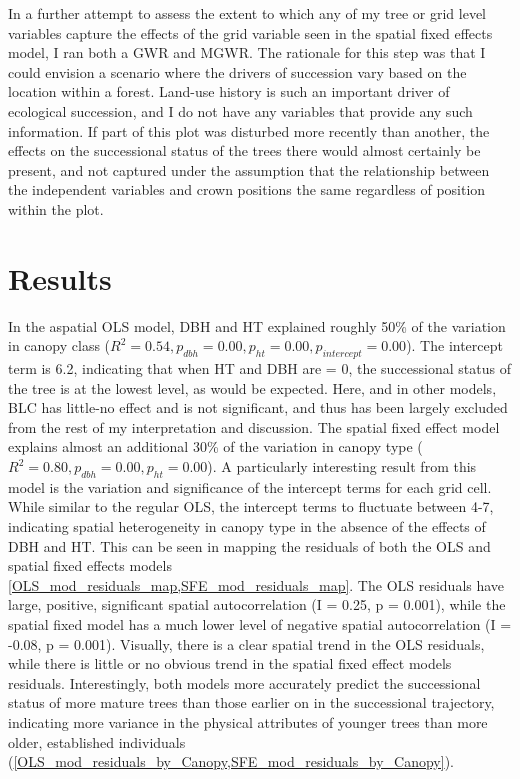 \documentclass[12pt,a4paper]{article}
\begin{document}
In a further attempt to assess the extent to which any of my tree or grid level variables capture the effects of the grid variable seen in the spatial fixed effects model, I ran both a GWR and MGWR.  The rationale for this step was that I could envision a scenario where the drivers of succession vary based on the location within a forest.  Land-use history is such an important driver of ecological succession, and I do not have any variables that provide any such information.  If part of this plot was disturbed more recently than another, the effects on the successional status of the trees there would almost certainly be present, and not captured under the assumption that the relationship between the independent variables and crown positions the same regardless of position within the plot.  

\section{Results}

In the aspatial OLS model, DBH and HT explained roughly 50\% of the variation in canopy class ($R^{2} = 0.54, p_{dbh} = 0.00, p_{ht} = 0.00, p_{intercept} = 0.00$).  The intercept term is 6.2, indicating that when HT and DBH are = 0, the successional status of the tree is at the lowest level, as would be expected.  Here, and in other models, BLC has little-no effect and is not significant, and thus has been largely excluded from the rest of my interpretation and discussion.  The spatial fixed effect model explains almost an additional 30\% of the variation in canopy type ($R^{2} = 0.80, p_{dbh} = 0.00, p_{ht} = 0.00$).  A particularly interesting result from this model is the variation and significance of the intercept terms for each grid cell.  While similar to the regular OLS, the intercept terms to fluctuate between 4-7, indicating spatial heterogeneity in canopy type in the absence of the effects of DBH and HT.  This can be seen in mapping the residuals of both the OLS and spatial fixed effects models \cref{OLS_mod_residuals_map,SFE_mod_residuals_map}.  The OLS residuals have large, positive, significant spatial autocorrelation (I = 0.25, p = 0.001), while the spatial fixed model has a much lower level of negative spatial autocorrelation (I = -0.08, p = 0.001).  Visually, there is a clear spatial trend in the OLS residuals, while there is little or no obvious trend in the spatial fixed effect models residuals.  Interestingly, both models more accurately predict the successional status of more mature trees than those earlier on in the successional trajectory, indicating more variance in the physical attributes of younger trees than more older, established individuals (\cref{OLS_mod_residuals_by_Canopy,SFE_mod_residuals_by_Canopy}).  
\end{document}
